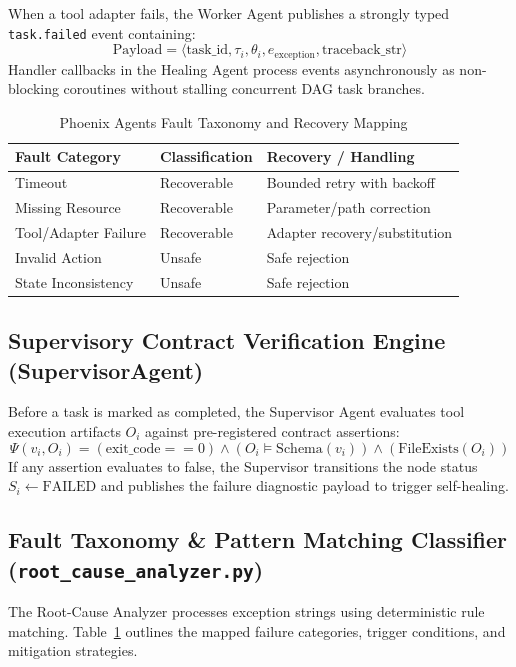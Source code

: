 \documentclass[conference]{IEEEtran}
\begin{document}
When a tool adapter fails, the Worker Agent publishes a strongly typed \texttt{task.failed} event containing:
\begin{equation}
\text{Payload} = \langle \text{task\_id}, \tau_i, \theta_i, e_{\text{exception}}, \text{traceback\_str} \rangle
\end{equation}
Handler callbacks in the Healing Agent process events asynchronously as non-blocking coroutines without stalling concurrent DAG task branches.

\begin{table}[t]
\centering
\caption{Phoenix Agents Fault Taxonomy and Recovery Mapping}
\label{tab:fault_taxonomy}
\footnotesize
\begin{tabularx}{\columnwidth}{p{}p{}X}
\toprule
\textbf{Fault Category} & \textbf{Classification} & \textbf{Recovery / Handling} \\
\midrule
Timeout & Recoverable & Bounded retry with backoff \\
Missing Resource & Recoverable & Parameter/path correction \\
Tool/Adapter Failure & Recoverable & Adapter recovery/substitution \\
Invalid Action & Unsafe & Safe rejection \\
State Inconsistency & Unsafe & Safe rejection \\
\bottomrule
\end{tabularx}
\end{table}

\subsection{Supervisory Contract Verification Engine (SupervisorAgent)}
Before a task is marked as completed, the Supervisor Agent evaluates tool execution artifacts $O_i$ against pre-registered contract assertions:
\begin{equation}
\Psi(v_i, O_i) = (\text{exit\_code} == 0) \land (O_i \models \text{Schema}(v_i)) \land (\text{FileExists}(O_i))
\end{equation}
If any assertion evaluates to false, the Supervisor transitions the node status $S_i \leftarrow \text{FAILED}$ and publishes the failure diagnostic payload to trigger self-healing.

\subsection{Fault Taxonomy \& Pattern Matching Classifier (\texttt{root\_cause\_analyzer.py})}
The Root-Cause Analyzer processes exception strings using deterministic rule matching. Table~\ref{tab:fault_taxonomy} outlines the mapped failure categories, trigger conditions, and mitigation strategies.
\end{document}
